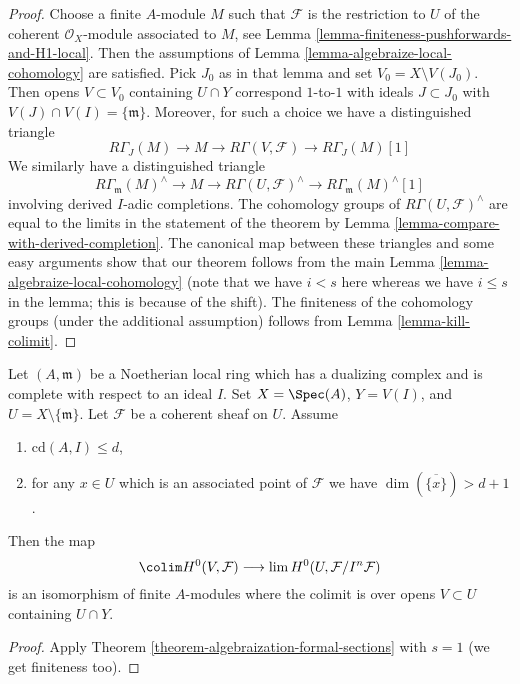 \begin{proof}
Choose a finite $A$-module $M$ such that $\mathcal{F}$ is the
restriction to $U$ of the
coherent $\mathcal{O}_X$-module associated to $M$, see
Lemma \ref{lemma-finiteness-pushforwards-and-H1-local}.
Then the assumptions of
Lemma \ref{lemma-algebraize-local-cohomology}
are satisfied.
Pick $J_0$ as in that lemma and set $V_0 = X \setminus V(J_0)$.
Then opens $V \subset V_0$ containing $U \cap Y$
correspond $1$-to-$1$ with ideals $J \subset J_0$ with
$V(J) \cap V(I) = \{\mathfrak m\}$.
Moreover, for such a choice we have a distinguished triangle
$$
R\Gamma_J(M) \to M \to R\Gamma(V, \mathcal{F}) \to
R\Gamma_J(M)[1]
$$
We similarly have a distinguished triangle
$$
R\Gamma_\mathfrak m(M)^\wedge \to
M \to
R\Gamma(U, \mathcal{F})^\wedge \to
R\Gamma_\mathfrak m(M)^\wedge[1]
$$
involving derived $I$-adic completions.
The cohomology groups of $R\Gamma(U, \mathcal{F})^\wedge$ are
equal to the limits in the statement of the theorem by
Lemma \ref{lemma-compare-with-derived-completion}.
The canonical map between these triangles
and some easy arguments show that our
theorem follows from the main Lemma \ref{lemma-algebraize-local-cohomology}
(note that we have $i < s$ here whereas we have
$i \leq s$ in the lemma; this is because of the shift).
The finiteness of the cohomology groups
(under the additional assumption) follows from
Lemma \ref{lemma-kill-colimit}.
\end{proof}

\begin{lemma}
\label{lemma-application-theorem}
Let $(A, \mathfrak m)$ be a Noetherian local ring which has a
dualizing complex and is complete with respect to an ideal $I$.
Set $X = \Spec(A)$, $Y = V(I)$, and $U = X \setminus \{\mathfrak m\}$.
Let $\mathcal{F}$ be a coherent sheaf on $U$.
Assume
\begin{enumerate}
\item $\text{cd}(A, I) \leq d$,
\item for any $x \in U$ which is an associated point of $\mathcal{F}$
we have $\dim(\overline{\{x\}}) > d + 1$.
\end{enumerate}
Then the map
$$
\colim H^0(V, \mathcal{F})
\longrightarrow
\lim H^0(U, \mathcal{F}/I^n\mathcal{F})
$$
is an isomorphism of finite $A$-modules
where the colimit is over opens $V \subset U$
containing $U \cap Y$.
\end{lemma}

\begin{proof}
Apply Theorem \ref{theorem-algebraization-formal-sections} with $s = 1$
(we get finiteness too).
\end{proof}




